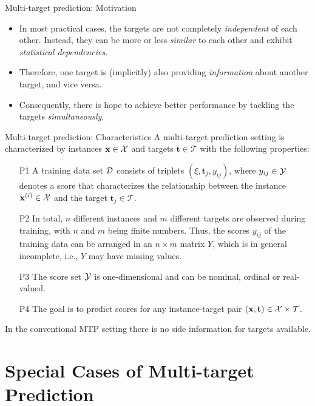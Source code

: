 \documentclass[11pt,compress,t,notes=noshow, xcolor=table]{beamer}
\newcommand{\Tspace}{\mathcal{T}}
\newcommand{\tv}{\mathbf{t}}
\newcommand{\tj}{\mathbf{t}_j}
\begin{document}
\begin{vbframe}{Multi-target prediction: Motivation}
{\begin{itemize}
%	
		\item In most practical cases, the targets are not completely \emph{independent} of each other. Instead, they can be more or less \emph{similar} to each other and exhibit \emph{statistical dependencies}.
%		
		\item Therefore, one target is (implicitly) also providing \emph{information} about another target, and vice versa.
%		
		\item Consequently, there is hope to achieve better performance by tackling the targets \emph{simultaneously}.
%

  \end{itemize}}
%
\end{vbframe}

\begin{frame}{Multi-target prediction: Characteristics}
% 
	\small
		A multi-target prediction setting is characterized by instances $\mathbf{x} \in \mathcal{X}$ and targets $\tv \in \Tspace$ with the following properties: 
%		
		\begin{itemize} \small
%		
			\item[P1] A training data set $\mathcal{D}$ consists of triplets $(\xi,\tj,y_{ij})$, where $y_{ij} \in \mathcal{Y}$ denotes a score that characterizes the relationship between the instance $\mathbf{x}^{(i)} \in \mathcal{X}$ and the target $\tj \in \Tspace$.  
%			
			\item[P2] In total, $n$ different instances and $m$ different targets are observed during training, with $n$ and $m$ being finite numbers. Thus, the scores $y_{ij}$ of the training data can be arranged in an $n \times m$ matrix $Y$, which is in general incomplete, i.e., $Y$ may have missing values.
%			
			\item[P3] The score set $\mathcal{Y}$ is one-dimensional and can be nominal, ordinal or real-valued.  
%			
			\item[P4] The goal is to predict scores for any instance-target pair $(\xv,\tv) \in \Xspace \times \Tspace$.   
%		
		\end{itemize}
% 
%
In the conventional MTP setting there is no side information for targets available. 
%	
%
\end{frame}

\section{Special Cases of Multi-target Prediction}
\end{document}
